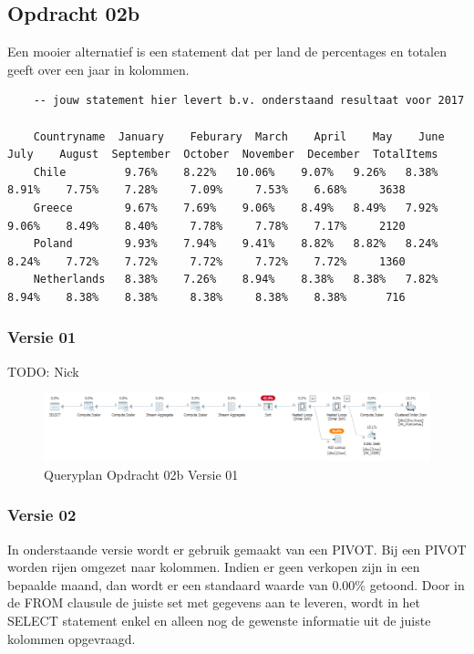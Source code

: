 \subsection{Opdracht 02b}
Een mooier alternatief is een statement dat per land de percentages en totalen geeft over een jaar in kolommen.

\begin{lstlisting}
    -- jouw statement hier levert b.v. onderstaand resultaat voor 2017

    Countryname  January	Feburary  March    April    May    June    July    August  September  October  November  December  TotalItems
    Chile         9.76%    8.22%   10.06%    9.07%   9.26%   8.38%   8.91%    7.75%    7.28%     7.09%     7.53%    6.68%     3638
    Greece        9.67%    7.69%    9.06%    8.49%   8.49%   7.92%   9.06%    8.49%    8.40%     7.78%     7.78%    7.17%     2120
    Poland        9.93%    7.94%    9.41%    8.82%   8.82%   8.24%   8.24%    7.72%    7.72%     7.72%     7.72%    7.72%     1360
    Netherlands   8.38%    7.26%    8.94%    8.38%   8.38%   7.82%   8.94%    8.38%    8.38%     8.38%     8.38%    8.38%      716
\end{lstlisting}

\subsubsection{Versie 01}
TODO: Nick

\begin{figure}[H]
    \centering
    \includegraphics[width=1\textwidth]{image/nick/opdracht-02b.PNG}
    \caption{Queryplan Opdracht 02b Versie 01}
\end{figure}

\subsubsection{Versie 02}

    In onderstaande versie wordt er gebruik gemaakt van een PIVOT. Bij een PIVOT worden rijen omgezet naar kolommen. Indien er geen verkopen
    zijn in een bepaalde maand, dan wordt er een standaard waarde van 0.00\% getoond. Door in de FROM clausule de juiste set met gegevens
    aan te leveren, wordt in het SELECT statement enkel en alleen nog de gewenste informatie uit de juiste kolommen opgevraagd.

